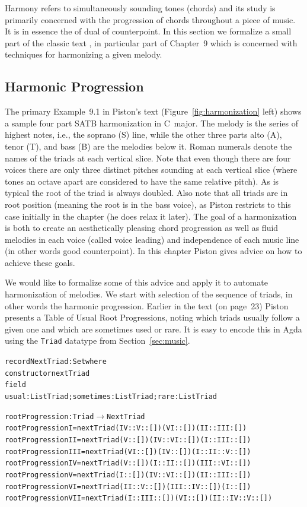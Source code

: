 Harmony refers to simultaneously sounding tones (chords) and its study
is primarily concerned with the progression of chords throughout a
piece of music. It is in essence the of dual of counterpoint. In this
section we formalize a small part of the classic text
\citet{piston-harmony}, in particular part of Chapter~9 which is
concerned with techniques for harmonizing a given melody.

\subsection{Harmonic Progression}
\label{sec:harmony:prog}

The primary Example~9.1 in Piston's text
(Figure~\ref{fig:harmonization} left) shows a
sample four part SATB harmonization in C~major. The melody is the
series of highest notes, i.e., the soprano (S) line, while the other three
parts alto (A), tenor (T), and bass (B) are the melodies below
it. Roman numerals denote the names of the triads at each vertical
slice. Note that even though there are four voices there are only
three distinct pitches sounding at each vertical slice (where tones an
octave apart are considered to have the same relative pitch). As is
typical the root of the triad is always doubled. Also note that all
triads are in root position (meaning the root is in the bass voice),
as Piston restricts to this case initially in the chapter (he does
relax it later). The goal of a harmonization is both to create an
aesthetically pleasing chord progression as well as fluid melodies in
each voice (called voice leading) and independence of each music
line (in other words good counterpoint). In this chapter
Piston gives advice on how to achieve these goals.

\Harmonization

We would like to formalize some of this advice and apply it to
automate harmonization of melodies. We start with selection of the
sequence of triads, in other words the harmonic progression. Earlier
in the text (on page~23) Piston presents a Table of Usual Root
Progressions, noting which triads usually follow a given one and
which are sometimes used or rare. It is easy to encode this in Agda
using the \texttt{Triad} datatype from Section~\ref{sec:music}.

\begin{alltt}
record NextTriad : Set where
  constructor nextTriad
  field
    usual : List Triad; sometimes : List Triad; rare : List Triad

rootProgression : Triad \(\rightarrow\) NextTriad
rootProgression I   = nextTriad (IV :: V :: []) (VI :: []) (II  :: III : [])
rootProgression II  = nextTriad (V :: []) (IV :: VI :: []) (I :: III :: [])
rootProgression III = nextTriad (VI :: []) (IV :: []) (I :: II :: V :: [])
rootProgression IV  = nextTriad (V :: []) (I :: II :: []) (III :: VI :: [])
rootProgression V   = nextTriad (I :: []) (IV :: VI :: []) (II :: III :: [])
rootProgression VI  = nextTriad (II :: V :: []) (III :: IV :: []) (I :: [])
rootProgression VII = nextTriad (I  :: III :: []) (VI :: []) (II :: IV  :: V :: [])
\end{alltt}

